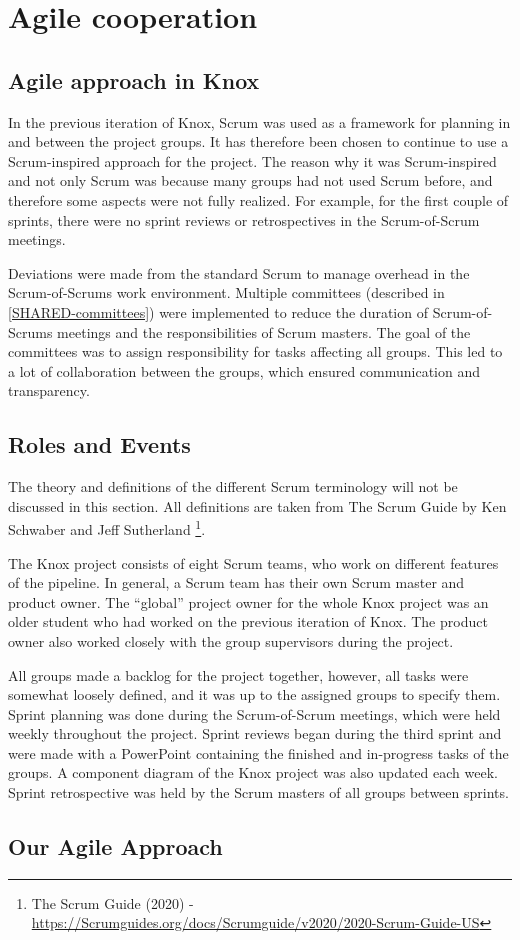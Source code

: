 \section{Agile cooperation}\label{knox_collaboration}


\subsection{Agile approach in Knox}\label{common_agile_methods}
In the previous iteration of Knox, Scrum was used as a framework for planning in and between the project groups. It has therefore been chosen to continue to use a Scrum-inspired approach for the project. The reason why it was Scrum-inspired and not only Scrum was because many groups had not used Scrum before, and therefore some aspects were not fully realized. For example, for the first couple of sprints, there were no sprint reviews or retrospectives in the Scrum-of-Scrum meetings.  

Deviations were made from the standard Scrum to manage overhead in the Scrum-of-Scrums work environment. Multiple committees (described in \autoref{SHARED-committees}) were implemented to reduce the duration of Scrum-of-Scrums meetings and the responsibilities of Scrum masters. The goal of the committees was to assign responsibility for tasks affecting all groups.
This led to a lot of collaboration between the groups, which ensured communication and transparency. 

\subsection{Roles and Events}\label{roles_and_events}
The theory and definitions of the different Scrum terminology will not be discussed in this section. All definitions are taken from The Scrum Guide by Ken Schwaber and Jeff Sutherland
\footnote{The Scrum Guide (2020) - \url{https://Scrumguides.org/docs/Scrumguide/v2020/2020-Scrum-Guide-US}}.


The Knox project consists of eight Scrum teams, who work on different features of the pipeline. In general, a Scrum team has their own Scrum master and product owner. The “global” project owner for the whole Knox project was an older student who had worked on the previous iteration of Knox. The product owner also worked closely with the group supervisors during the project.

All groups made a backlog for the project together, however, all tasks were somewhat loosely defined, and it was up to the assigned groups to specify them. Sprint planning was done during the Scrum-of-Scrum meetings, which were held weekly throughout the project. Sprint reviews began during the third sprint and were made with a PowerPoint containing the finished and in-progress tasks of the groups. A component diagram of the Knox project was also updated each week. Sprint retrospective was held by the Scrum masters of all groups between sprints.

\subsection{Our Agile Approach}\label{our_agile_approach}
